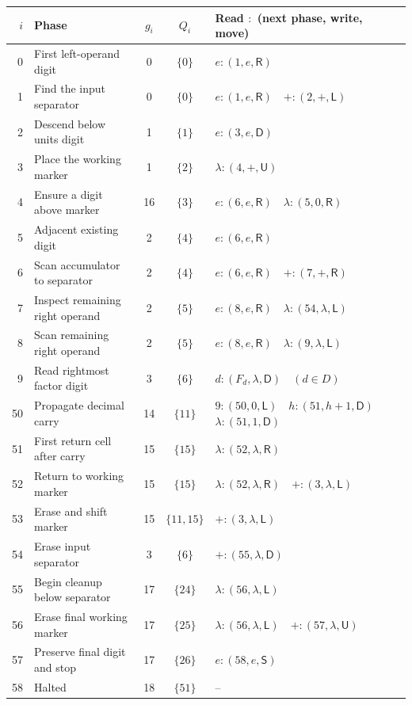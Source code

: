 \documentclass[11pt,a4paper]{article}
\newcommand{\blank}{\lambda}
\newcommand{\triple}[3]{(#1,#2,\mathsf{#3})}
\begin{document}
\begin{center}
\fontsize{9.1}{11}\selectfont\renewcommand{\arraystretch}{1.3}
\setlength{\tabcolsep}{4pt}
\begin{tabularx}{\textwidth}{r p{4.8cm} c c X}
\toprule\rowcolor{Pale}$i$ & Phase & $g_i$ & $Q_i$ & Read $:$ (next phase, write, move)\\\midrule
0 & First left-operand digit & 0 & $\{0\}$ & $e:\triple{1}{e}{R}$\\
1 & Find the input separator & 0 & $\{0\}$ & $e:\triple{1}{e}{R}\quad +:\triple{2}{+}{L}$\\
2 & Descend below units digit & 1 & $\{1\}$ & $e:\triple{3}{e}{D}$\\
3 & Place the working marker & 1 & $\{2\}$ & $\blank:\triple{4}{+}{U}$\\
4 & Ensure a digit above marker & 16 & $\{3\}$ & $e:\triple{6}{e}{R}\quad\blank:\triple{5}{0}{R}$\\
5 & Adjacent existing digit & 2 & $\{4\}$ & $e:\triple{6}{e}{R}$\\
6 & Scan accumulator to separator & 2 & $\{4\}$ & $e:\triple{6}{e}{R}\quad +:\triple{7}{+}{R}$\\
7 & Inspect remaining right operand & 2 & $\{5\}$ & $e:\triple{8}{e}{R}\quad\blank:\triple{54}{\blank}{L}$\\
8 & Scan remaining right operand & 2 & $\{5\}$ & $e:\triple{8}{e}{R}\quad\blank:\triple{9}{\blank}{L}$\\
9 & Read rightmost factor digit & 3 & $\{6\}$ & $d:\triple{F_d}{\blank}{D}\quad(d\in D)$\\
\midrule
50 & Propagate decimal carry & 14 & $\{11\}$ & $9:\triple{50}{0}{L}\quad h:\triple{51}{h+1}{D}$\newline $\blank:\triple{51}{1}{D}$\\
51 & First return cell after carry & 15 & $\{15\}$ & $\blank:\triple{52}{\blank}{R}$\\
52 & Return to working marker & 15 & $\{15\}$ & $\blank:\triple{52}{\blank}{R}\quad +:\triple{3}{\blank}{L}$\\
53 & Erase and shift marker & 15 & $\{11,15\}$ & $+:\triple{3}{\blank}{L}$\\
54 & Erase input separator & 3 & $\{6\}$ & $+:\triple{55}{\blank}{D}$\\
55 & Begin cleanup below separator & 17 & $\{24\}$ & $\blank:\triple{56}{\blank}{L}$\\
56 & Erase final working marker & 17 & $\{25\}$ & $\blank:\triple{56}{\blank}{L}\quad +:\triple{57}{\blank}{U}$\\
57 & Preserve final digit and stop & 17 & $\{26\}$ & $e:\triple{58}{e}{S}$\\
58 & Halted & 18 & $\{51\}$ & --\\
\bottomrule
\end{tabularx}
\end{center}
\end{document}

